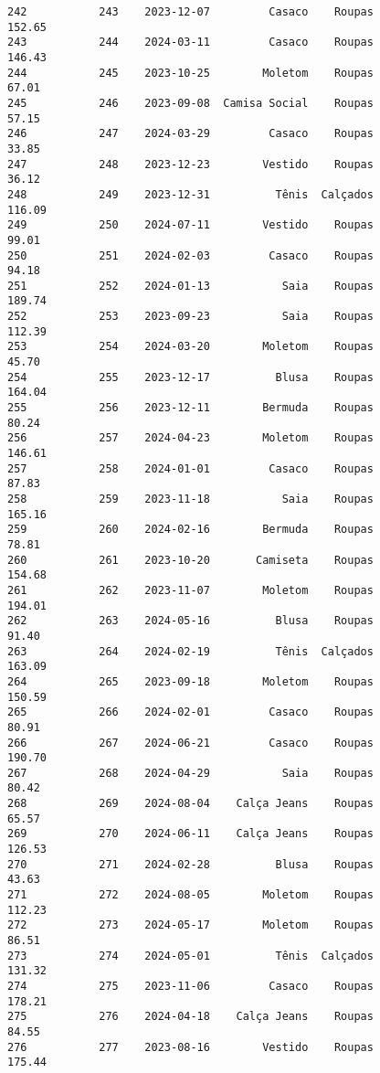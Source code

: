 \documentclass[11pt]{article}
\begin{document}
\begin{Verbatim}[commandchars=\\\{\}]
242           243    2023-12-07         Casaco    Roupas          152.65   
243           244    2024-03-11         Casaco    Roupas          146.43   
244           245    2023-10-25        Moletom    Roupas           67.01   
245           246    2023-09-08  Camisa Social    Roupas           57.15   
246           247    2024-03-29         Casaco    Roupas           33.85   
247           248    2023-12-23        Vestido    Roupas           36.12   
248           249    2023-12-31          Tênis  Calçados          116.09   
249           250    2024-07-11        Vestido    Roupas           99.01   
250           251    2024-02-03         Casaco    Roupas           94.18   
251           252    2024-01-13           Saia    Roupas          189.74   
252           253    2023-09-23           Saia    Roupas          112.39   
253           254    2024-03-20        Moletom    Roupas           45.70   
254           255    2023-12-17          Blusa    Roupas          164.04   
255           256    2023-12-11        Bermuda    Roupas           80.24   
256           257    2024-04-23        Moletom    Roupas          146.61   
257           258    2024-01-01         Casaco    Roupas           87.83   
258           259    2023-11-18           Saia    Roupas          165.16   
259           260    2024-02-16        Bermuda    Roupas           78.81   
260           261    2023-10-20       Camiseta    Roupas          154.68   
261           262    2023-11-07        Moletom    Roupas          194.01   
262           263    2024-05-16          Blusa    Roupas           91.40   
263           264    2024-02-19          Tênis  Calçados          163.09   
264           265    2023-09-18        Moletom    Roupas          150.59   
265           266    2024-02-01         Casaco    Roupas           80.91   
266           267    2024-06-21         Casaco    Roupas          190.70   
267           268    2024-04-29           Saia    Roupas           80.42   
268           269    2024-08-04    Calça Jeans    Roupas           65.57   
269           270    2024-06-11    Calça Jeans    Roupas          126.53   
270           271    2024-02-28          Blusa    Roupas           43.63   
271           272    2024-08-05        Moletom    Roupas          112.23   
272           273    2024-05-17        Moletom    Roupas           86.51   
273           274    2024-05-01          Tênis  Calçados          131.32   
274           275    2023-11-06         Casaco    Roupas          178.21   
275           276    2024-04-18    Calça Jeans    Roupas           84.55   
276           277    2023-08-16        Vestido    Roupas          175.44   

\end{Verbatim}
\end{document}
